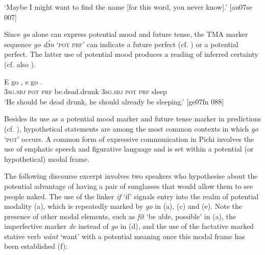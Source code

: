\glt ‘Maybe I might want to find the name [for this word, you never know].’ [au07se 007]
\z

Since \textit{go} alone can express potential mood and future tense, the TMA marker sequence \textit{go dɔ́n} ‘\textsc{pot} \textsc{prf}’ can indicate a future perfect (cf. ) or a potential perfect. The latter use of potential mood produces a reading of inferred certainty (cf. also ).


\ea%
    \label{ex:key:446}
    \gll E    go   ,      e    go  .\\
\textsc{3sg.sbj}  \textsc{pot}  \textsc{prf}  be.dead.drunk  \textsc{3sg.sbj}  \textsc{pot}  \textsc{prf}  sleep\\

\glt ‘He should be dead drunk, he should already be sleeping.’ [ge07fn 088]
\z

Besides its use as a potential mood marker and future tense marker in predictions (cf. ), hypothetical statements are among the most common contexts in which \textit{go} ‘\textsc{pot’} occurs. A common form of expressive communication in Pichi involves the use of emphatic speech and figurative language and is set within a potential (or hypothetical) modal frame.


The following discourse excerpt involves two speakers who hypothesise about the potential advantage of having a pair of sunglasses that would allow them to see people naked. The use of the linker \textit{if} ‘if’ signals entry into the realm of potential modality (a), which is repeatedly marked by \textit{go} in (a), (c) and (e). Note the presence of other modal elements, such as \textit{fít} ‘be able, possible’ in (a), the imperfective marker \textit{de} instead of \textit{go} in (d), and the use of the factative marked stative verb \textit{wánt} ‘want’ with a potential meaning once this modal frame has been established (f): 



